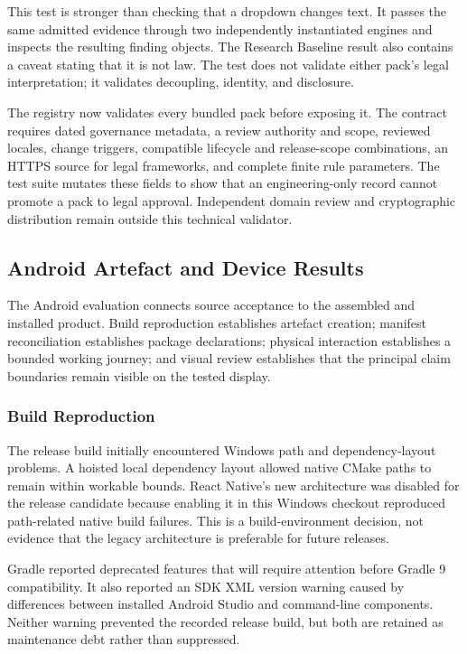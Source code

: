 This test is stronger than checking that a dropdown changes text. It passes the same admitted evidence through two independently instantiated engines and inspects the resulting finding objects. The Research Baseline result also contains a caveat stating that it is not law. The test does not validate either pack's legal interpretation; it validates decoupling, identity, and disclosure.

The registry now validates every bundled pack before exposing it. The contract requires dated governance metadata, a review authority and scope, reviewed locales, change triggers, compatible lifecycle and release-scope combinations, an HTTPS source for legal frameworks, and complete finite rule parameters. The test suite mutates these fields to show that an engineering-only record cannot promote a pack to legal approval. Independent domain review and cryptographic distribution remain outside this technical validator.

\subsection{Android Artefact and Device Results}

The Android evaluation connects source acceptance to the assembled and installed product. Build reproduction establishes artefact creation; manifest reconciliation establishes package declarations; physical interaction establishes a bounded working journey; and visual review establishes that the principal claim boundaries remain visible on the tested display.

\subsubsection{Build Reproduction}

The release build initially encountered Windows path and dependency-layout problems. A hoisted local dependency layout allowed native CMake paths to remain within workable bounds. React Native's new architecture was disabled for the release candidate because enabling it in this Windows checkout reproduced path-related native build failures. This is a build-environment decision, not evidence that the legacy architecture is preferable for future releases.

Gradle reported deprecated features that will require attention before Gradle 9 compatibility. It also reported an SDK XML version warning caused by differences between installed Android Studio and command-line components. Neither warning prevented the recorded release build, but both are retained as maintenance debt rather than suppressed.

